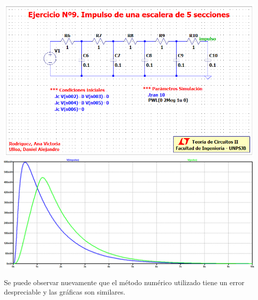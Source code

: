 \documentclass[10pt,a4paper]{article} %
\begin{document}
\begin{center}
	\includegraphics[scale=0.5]{simulacion91}
	\includegraphics[scale=0.4]{simulacion92}

\end{center}
Se puede observar nuevamente que el método numérico utilizado tiene un error despreciable y las gráficas son similares. 
\end{document}
